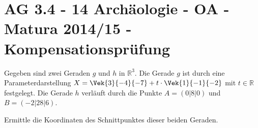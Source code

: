 \section{AG 3.4 - 14 Archäologie - OA - Matura 2014/15 - Kompensationsprüfung}

\begin{beispiel}[AG 3.4]{1} %
				Gegeben sind zwei Geraden $g$ und $h$ in $\mathbb{R}^{3}$.
				Die Gerade $g$ ist durch eine Parameterdarstellung $X=\Vek{3}{-4}{-7}+t\cdot\Vek{1}{-1}{-2}$ mit $t\in\mathbb{R}$ festgelegt.
				Die Gerade $h$ verläuft durch die Punkte $A=(0|8|0)$ und $B=(-2|28|6)$.
				
				Ermittle die Koordinaten des Schnittpunktes dieser beiden Geraden.
				
\end{beispiel}